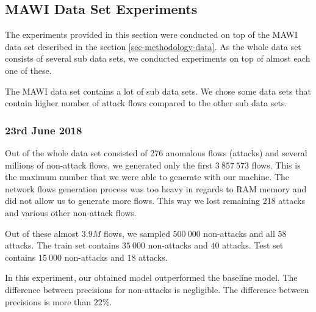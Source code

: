 \documentclass{article}
\begin{document}
\clearpage

\subsection{MAWI Data Set Experiments}\label{sec-mawi-experiments}


The experiments provided in this section were conducted on top of the MAWI data set described in the section \ref{sec-methodology-data}. As the whole data set consists of several sub data sets, we conducted experiments on top of almost each one of these.

The MAWI data set contains a lot of sub data sets. We chose some data sets that contain higher number of attack flows compared to the other sub data sets.

\subsubsection{23rd June 2018}

Out of the whole data set consisted of 276 anomalous flows (attacks) and several millions of non-attack flows, we generated only the first $3\ 857\ 573$ flows. This is the maximum number that we were able to generate with our machine. The network flows generation process was too heavy in regards to RAM memory and did not allow us to generate more flows. This way we lost remaining 218 attacks and various other non-attack flows.

Out of these almost $3.9M$ flows, we sampled $500\ 000$ non-attacks and all 58 attacks. The train set contains $35\ 000$ non-attacks and $40$ attacks. Test set contains $15\ 000$ non-attacks and $18$ attacks.

In this experiment, our obtained model outperformed the baseline model. The difference between precisions for non-attacks is negligible. The difference between precisions is more than $22\%$.
\end{document}
